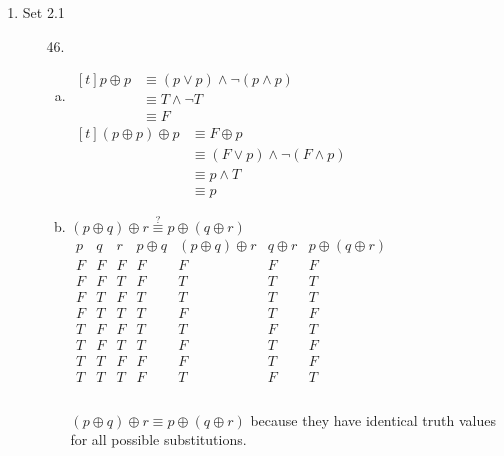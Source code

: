 \documentclass[letterpaper]{article}
\begin{document}
\begin{enumerate}
\begin{enumerate}
			\item Set 2.1
			\begin{itemize}
				\item [46.] \quad
				\begin{enumerate}[(a)]
					\item 
					$\begin{aligned}[t]
						p \oplus p & \equiv \left( p \vee p \right) \wedge \neg \left( p \wedge p \right) &\\
						& \equiv T \wedge \neg T &\\
						& \equiv F &
					\end{aligned}$
					\qquad
					$\begin{aligned}[t]
						\left( p \oplus p \right) \oplus p & \equiv F \oplus p &\\
						& \equiv \left( F \vee p \right) \wedge \neg \left( F \wedge p \right) &\\
						& \equiv p \wedge T &\\
						& \equiv p &
					\end{aligned}$
					
					\item
					$\left( p \oplus q \right) \oplus r \stackrel{?}{\equiv} p \oplus \left( q \oplus r \right)$ \\
					$\begin{array}{c|c|c|c|c|c|c}
						p & q & r & p \oplus q & \left( p \oplus q \right) \oplus r & q \oplus r & p \oplus \left( q \oplus r \right) \\ \hline
						F & F & F & F & F & F & F \\ \hline
						F & F & T & F & T & T & T \\ \hline
						F & T & F & T & T & T & T \\ \hline
						F & T & T & T & F & T & F \\ \hline
						T & F & F & T & T & F & T \\ \hline
						T & F & T & T & F & T & F \\ \hline
						T & T & F & F & F & T & F \\ \hline
						T & T & T & F & T & F & T \\ 
					\end{array}$ \\
					\\
					$\left( p \oplus q \right) \oplus r \equiv p \oplus \left( q \oplus r \right)$ because they have identical truth values for all possible substitutions.
					
				\end{enumerate}
			\end{itemize}
			

\end{enumerate}
\end{enumerate}
\end{document}
